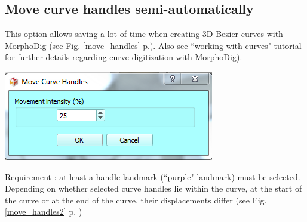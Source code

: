 \subsection{Move curve handles semi-automatically}
\noindent
\begin{minipage}{0.5\textwidth}
This option allows saving a lot of time when creating
3D Bezier curves with MorphoDig (see Fig. \ref{move_handles} p.\pageref{move_handles}). Also see ``working
with curves" tutorial for further details regarding curve digitization with MorphoDig).
\end{minipage}    
\begin{minipage}{0.5\textwidth}\centering
  \includegraphics[scale=0.5]{images/10/move.png}
 \end{minipage} 
\noindent



Requirement : at least a handle landmark (``purple" landmark) must be selected.
Depending on whether selected curve handles lie within the curve, at the start of the curve or at the
end of the curve, their displacements differ (see Fig. \ref{move_handles2} p. \pageref{move_handles2})





